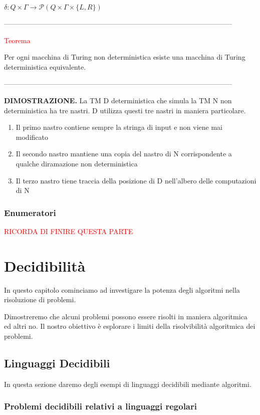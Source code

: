 \documentclass{article}
\begin{document}
\begin{center}
    $\delta: Q \times \Gamma \rightarrow \mathcal{P}(Q \times \Gamma \times \{L,
    R\})$
\end{center}

--------------------------------------------------------------------------------------------------

\begin{center}
    \textcolor{red}{Teorema}
\end{center}

Per ogni macchina di Turing non deterministica esiste una macchina di Turing
deterministica equivalente.

--------------------------------------------------------------------------------------------------

\textbf{DIMOSTRAZIONE.}  La TM D deterministica che simula la TM N non
deterministica ha tre nastri. D utilizza questi tre nastri in maniera
particolare.

\begin{enumerate}
    \item Il primo nastro contiene sempre la stringa di input e non viene mai
    modificato
    \item Il secondo nastro mantiene una copia del nastro di N corrispondente a
    qualche diramazione non deterministica
    \item Il terzo nastro tiene traccia della posizione di D nell'albero delle
    computazioni di N
\end{enumerate}

\subsubsection{Enumeratori}

\textcolor{red}{RICORDA DI FINIRE QUESTA PARTE}

\section{Decidibilità}

In questo capitolo cominciamo ad investigare la potenza degli algoritmi nella
risoluzione di problemi.

Dimostreremo che alcuni problemi possono essere risolti in maniera algoritmica
ed altri no. Il nostro obiettivo è esplorare i limiti della risolvibilità
algoritmica dei problemi. 

\subsection{Linguaggi Decidibili}

In questa sezione daremo degli esempi di linguaggi decidibili mediante
algoritmi.

\subsubsection{Problemi decidibili relativi a linguaggi regolari}
\end{document}
